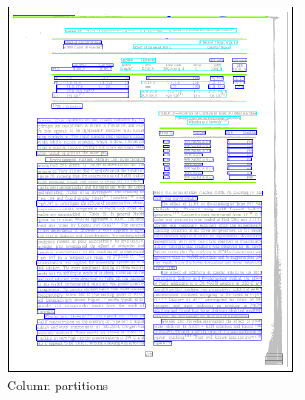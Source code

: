 \begin{figure}
\begin{subfigure}{0.30\textwidth}
\includegraphics[width=\linewidth]{img/tableDetection/tableDetectionPartitions.pdf}
\caption{Column partitions}
\label{fig:tessTableDet2}
\end{subfigure}
\quad
\begin{subfigure}{0.30\textwidth}

\end{subfigure}
\end{figure}
